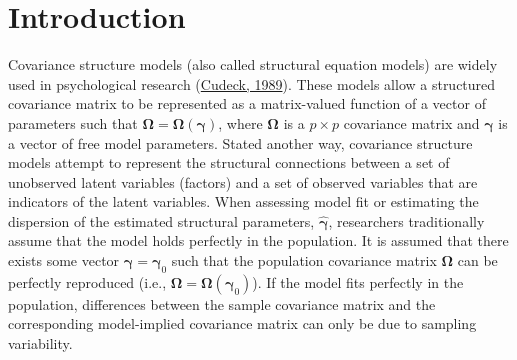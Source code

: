 \documentclass[11pt]{umnthesis}
\begin{document}
\tableofcontents{}



  \cleardoublepage
  \listoftables



  \cleardoublepage
  \listoffigures




\mainmatter 
\pagestyle{fancyplain} %

\hypertarget{intro}{%
\chapter{Introduction}\label{intro}}

Covariance structure models (also called structural equation models) are widely used in psychological research (\protect\hyperlink{ref-cudeck1989}{Cudeck, 1989}). These models allow a structured covariance matrix to be represented as a matrix-valued function of a vector of parameters such that \(\bm{\Omega}= \bm{\Omega}(\bm{\gamma})\), where \(\bm{\Omega}\) is a \(p \times p\) covariance matrix and \(\bm{\gamma}\) is a vector of free model parameters. Stated another way, covariance structure models attempt to represent the structural connections between a set of unobserved latent variables (factors) and a set of observed variables that are indicators of the latent variables. When assessing model fit or estimating the dispersion of the estimated structural parameters, \(\hat{\bm{\gamma}}\), researchers traditionally assume that the model holds perfectly in the population. It is assumed that there exists some vector \(\bm{\gamma} = \bm{\gamma}_0\) such that the population covariance matrix \(\bm{\Omega}\) can be perfectly reproduced (i.e., \(\bm{\Omega} = \bm{\Omega}(\bm{\gamma}_0)\)). If the model fits perfectly in the population, differences between the sample covariance matrix and the corresponding model-implied covariance matrix can only be due to sampling variability.
\end{document}
